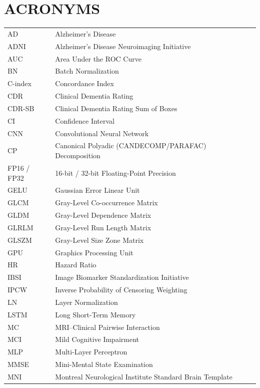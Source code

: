 \chapter*{ACRONYMS}

{\renewcommand{\baselinestretch}{1.15}\normalsize
\renewcommand{\arraystretch}{1.2}
\begin{longtable}{@{}L{2.6cm}L{12.9cm}@{}}
AD & Alzheimer's Disease \\
ADNI & Alzheimer's Disease Neuroimaging Initiative \\
AUC & Area Under the ROC Curve \\[0.8em]
BN & Batch Normalization \\[0.8em]
C-index & Concordance Index \\
CDR & Clinical Dementia Rating \\
CDR-SB & Clinical Dementia Rating Sum of Boxes \\
CI & Confidence Interval \\
CNN & Convolutional Neural Network \\
CP & Canonical Polyadic (CANDECOMP/PARAFAC) Decomposition \\[0.8em]
FP16 / FP32 & 16-bit / 32-bit Floating-Point Precision \\[0.8em]
GELU & Gaussian Error Linear Unit \\
GLCM & Gray-Level Co-occurrence Matrix \\
GLDM & Gray-Level Dependence Matrix \\
GLRLM & Gray-Level Run Length Matrix \\
GLSZM & Gray-Level Size Zone Matrix \\
GPU & Graphics Processing Unit \\[0.8em]
HR & Hazard Ratio \\[0.8em]
IBSI & Image Biomarker Standardization Initiative \\
IPCW & Inverse Probability of Censoring Weighting \\[0.8em]
LN & Layer Normalization \\
LSTM & Long Short-Term Memory \\[0.8em]
MC & MRI--Clinical Pairwise Interaction \\
MCI & Mild Cognitive Impairment \\
MLP & Multi-Layer Perceptron \\
MMSE & Mini-Mental State Examination \\
MNI & Montreal Neurological Institute Standard Brain Template \\

\end{longtable}}
